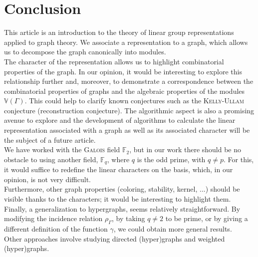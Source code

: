 \documentclass[preprint,12pt,authoryear]{elsarticle}
\theoremstyle{definition}
\begin{document}

\section{Conclusion}


This article is an introduction to the theory of linear group representations applied to graph theory. We associate a representation to a graph, which allows us to decompose the graph canonically into modules.\\
The character of the representation allows us to highlight combinatorial properties of the graph. In our opinion, it would be interesting to explore this relationship further and, moreover, to demonstrate a correspondence between the combinatorial properties of graphs and the algebraic properties of the modules $\mathbb{V}(\Gamma)$. This could help to clarify known conjectures such as the \textsc{Kelly-Ullam} conjecture (reconstruction conjecture). The algorithmic aspect is also a promising avenue to explore and the development of algorithms to calculate the linear representation associated with a graph as well as its associated character will be the subject of a future article.\\
We have worked with the  \textsc{Galois} field $\mathbb{F}_{2}$, but in our work there should be no obstacle to using another field, $\mathbb{F}_{q}$, where $q$ is the odd prime, with $q\neq p$. For this, it would suffice to redefine the linear characters on the basis, which, in our opinion, is not very difficult.\\
Furthermore, other graph properties (coloring, stability, kernel, ...) should be visible thanks to the characters; it would be interesting to highlight them.\\
Finally, a generalization to hypergraphs, \cite{bre4} seems relatively straightforward. By modifying the incidence relation $\rho_{\Gamma}$, by taking $q\neq2$ to be prime, or by giving a different definition of the function $\gamma$, we could obtain more general results.\\
Other approaches involve studying directed (hyper)graphs and weighted (hyper)graphs.
\end{document}
